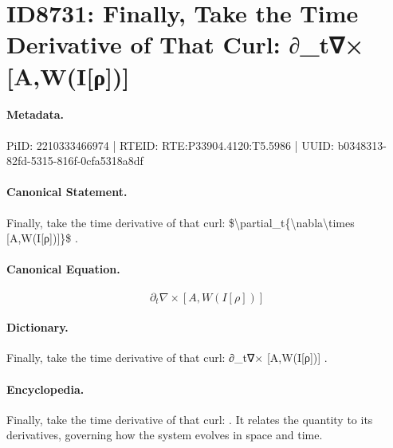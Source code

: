 \section*{ID8731: Finally, Take the Time Derivative of That Curl: ∂\_t∇× [A,W(I[ρ])]}
\paragraph{Metadata.}
PiID: 2210333466974 | RTEID: RTE:P33904.4120:T5.5986 | UUID: b0348313-82fd-5315-816f-0cfa5318a8df

\paragraph{Canonical Statement.}
Finally, take the time derivative of that curl: \$\textbackslash{}partial\_t\{\textbackslash{}nabla\textbackslash{}times [A,W(I[ρ])]\}\$ .

\paragraph{Canonical Equation.}
\[
\partial_t{\nabla\times [A,W(I[ρ])]}
\]

\paragraph{Dictionary.}
Finally, take the time derivative of that curl: ∂\_t∇× [A,W(I[ρ])] .

\paragraph{Encyclopedia.}
Finally, take the time derivative of that curl: . It relates the quantity to its derivatives, governing how the system evolves in space and time.

